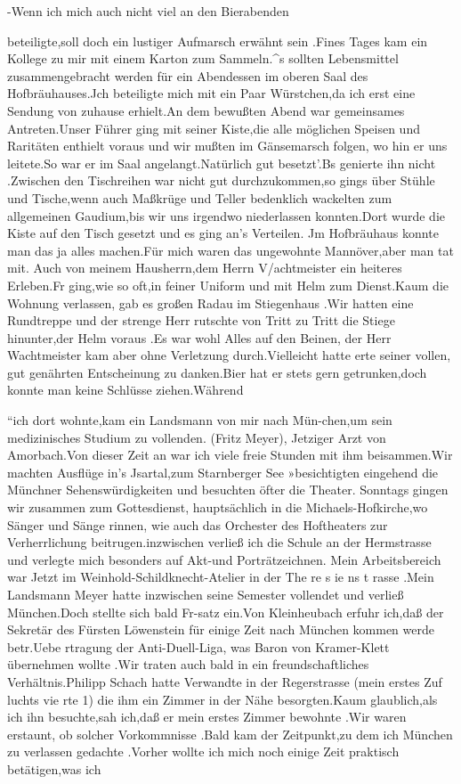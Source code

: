 \documentclass[a4paper,11pt]{article}
\begin{document}
-Wenn ich mich auch nicht viel an den Bierabenden

 beteiligte,soll doch ein lustiger Aufmarsch erwähnt sein .Fines Tages kam ein Kollege zu mir mit einem Karton zum Sammeln.^s sollten Lebensmittel zusammengebracht werden für ein Abendessen im oberen Saal des Hofbräuhauses.Jch beteiligte mich mit ein Paar Würstchen,da ich erst eine Sendung von zuhause erhielt.An dem bewußten Abend war gemeinsames Antreten.Unser Führer ging mit seiner Kiste,die alle möglichen Speisen und Raritäten enthielt voraus und wir mußten im Gänsemarsch folgen, wo hin er uns leitete.So war er im Saal angelangt.Natürlich gut besetzt’.Bs genierte ihn nicht .Zwischen den Tischreihen war nicht gut durchzukommen,so gings über Stühle und Tische,wenn auch Maßkrüge und Teller bedenklich wackelten zum allgemeinen Gaudium,bis wir uns irgendwo niederlassen konnten.Dort wurde die Kiste auf den Tisch gesetzt und es ging an's Verteilen. Jm Hofbräuhaus konnte man das ja alles machen.Für mich waren das ungewohnte Mannöver,aber man tat mit. Auch von meinem Hausherrn,dem Herrn V/achtmeister ein heiteres Erleben.Fr ging,wie so oft,in feiner Uniform und mit Helm zum Dienst.Kaum die Wohnung verlassen, gab es großen Radau im Stiegenhaus .Wir hatten eine Rundtreppe und der strenge Herr rutschte von Tritt zu Tritt die Stiege hinunter,der Helm voraus .Es war wohl Alles auf den Beinen, der Herr Wachtmeister kam aber ohne Verletzung durch.Vielleicht hatte erte seiner vollen, gut genährten Entscheinung zu danken.Bier hat er stets gern getrunken,doch konnte man keine Schlüsse ziehen.Während

“ich dort wohnte,kam ein Landsmann von mir nach Mün-chen,um sein medizinisches Studium zu vollenden. (Fritz Meyer), Jetziger Arzt von Amorbach.Von dieser Zeit an war ich viele freie Stunden mit ihm beisammen.Wir machten Ausflüge in's Jsartal,zum Starnberger See »besichtigten eingehend die Münchner Sehenswürdigkeiten und besuchten öfter die Theater. Sonntags gingen wir zusammen zum Gottesdienst, hauptsächlich in die Michaels-Hofkirche,wo Sänger und Sänge rinnen, wie auch das Orchester des Hoftheaters zur Verherrlichung beitrugen.inzwischen verließ ich die Schule an der Hermstrasse und verlegte mich besonders auf Akt-und Porträtzeichnen. Mein Arbeitsbereich war Jetzt im Weinhold-Schildknecht-Atelier in der The re s ie ns t rasse .Mein Landsmann Meyer hatte inzwischen seine Semester vollendet und verließ München.Doch stellte sich bald Fr-satz ein.Von Kleinheubach erfuhr ich,daß der Sekretär des Fürsten Löwenstein für einige Zeit nach München kommen werde betr.Uebe rtragung der Anti-Duell-Liga, was Baron von Kramer-Klett übernehmen wollte .Wir traten auch bald in ein freundschaftliches Verhältnis.Philipp Schach hatte Verwandte in der Regerstrasse (mein erstes Zuf luchts vie rte 1) die ihm ein Zimmer in der Nähe besorgten.Kaum glaublich,als ich ihn besuchte,sah ich,daß er mein erstes Zimmer bewohnte .Wir waren erstaunt, ob solcher Vorkommnisse .Bald kam der Zeitpunkt,zu dem ich München zu verlassen gedachte .Vorher wollte ich mich noch einige Zeit praktisch betätigen,was ich
\end{document}

